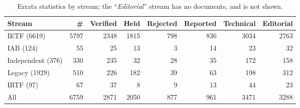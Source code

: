 \begin{table*}
\centering
\footnotesize
\begin{tabular}{lr|rrrr|rr}
\toprule
\textbf{Stream} & \textbf{\#} & \textbf{Verified} & \textbf{Held} & \textbf{Rejected} & \textbf{Reported} & \textbf{Technical} & \textbf{Editorial} \\
\midrule
IETF (6619) & 5797  & 2348  & 1815  & 798  & 836  & 3034  & 2763 \\
IAB (124) & 55  & 25  & 13  & 3  & 14  & 23  & 32 \\
Independent (376) & 330  & 235  & 32  & 28  & 35  & 172  & 158 \\
Legacy (1929) & 510  & 226  & 182  & 39  & 63  & 198  & 312 \\
IRTF (97) & 67  & 37  & 8  & 9  & 13  & 44  & 23 \\
\midrule All & 6759  & 2871  & 2050  & 877  & 961  & 3471  & 3288 \\
\bottomrule
\end{tabular}
\caption{Errata statistics by stream; the ``\emph{Editorial}'' stream has no documents, and is not shown.}
\label{tab:errata-stats-stream}
\end{table*}
